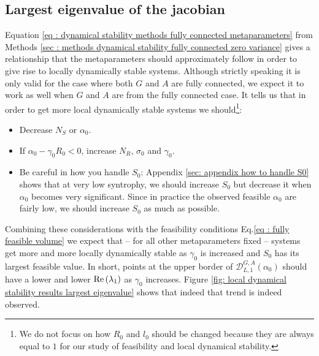 \documentclass[12pt, titlepage]{report}
\begin{document}
\subsection{Largest eigenvalue of the jacobian} \label{sec: largest eigenvalue of the jacobian}
Equation \eqref{eq : dynamical stability methods fully connected metaparameters} from Methods \ref{sec : methods dynamical stability fully connected zero variance} gives a relationship that the metaparameters should approximately follow in order to give rise to locally dynamically stable systems. Although strictly speaking it is only valid for the case where both $G$ and $A$ are fully connected, we expect it to work as well when $G$ and $A$ are  from the fully connected case. It tells us that in order to get more local dynamically stable systems we should\footnote{We do not focus on how $R_0$ and $l_0$ should be changed because they are always equal to $1$ for our study of feasibility and local dynamical stability. }:
\begin{itemize}
  \item Decrease $N_S$ %
or $\alpha_0$.
  \item If $\alpha_0 - \gamma_0 R_0 < 0$, increase $N _R$, $\sigma_0$ and $\gamma_0$.
  \item Be careful in how you handle $S_0$: %
  Appendix \ref{sec: appendix how to handle S0} shows that at very low syntrophy, we should increase $S_0$ but decrease it when $\alpha_0$ becomes very significant. Since in practice the observed feasible $\alpha_0$ are fairly low, we  should increase $S_0$ as much as possible.
\end{itemize}
Combining these considerations with the feasibility conditions Eq.\eqref{eq : fully feasible volume} we expect that -- for all other metaparameters fixed -- systems get more and more locally dynamically stable as $\gamma_0$ is increased and $S_0$ has its largest feasible value. In short, points at the upper border of $\mathcal{D}^{G,A}_{L,1}(\alpha_0)$ should have a lower and lower $\text{Re}\left(\lambda_1\right)$ as $\gamma_0$ increases. Figure \ref{fig: local dynamical stability results largest eigenvalue} shows that indeed that trend is indeed observed.
\end{document}

